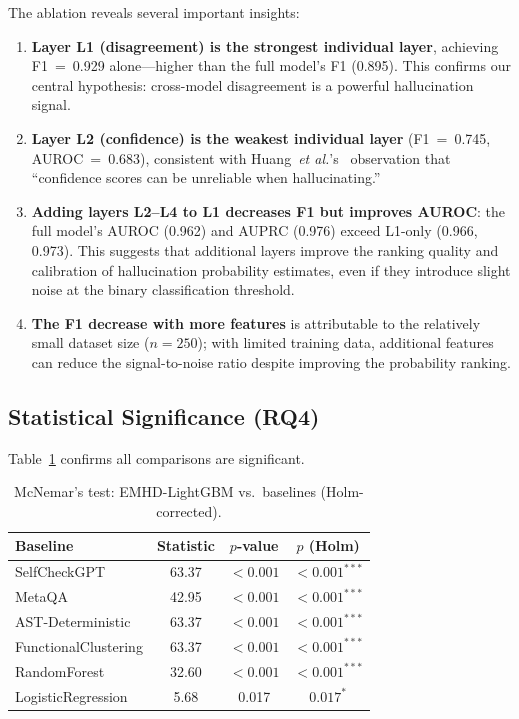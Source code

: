 \documentclass[11pt,a4paper]{article}
\newcommand{\etal}{\textit{et al.}}
\begin{document}
The ablation reveals several important insights:
\begin{enumerate}
\item \textbf{Layer L1 (disagreement) is the strongest individual layer}, achieving F1~=~0.929 alone---higher than the full model's F1 (0.895). This confirms our central hypothesis: cross-model disagreement is a powerful hallucination signal.
\item \textbf{Layer L2 (confidence) is the weakest individual layer} (F1~=~0.745, AUROC~=~0.683), consistent with Huang~\etal's~\cite{huang2025survey} observation that ``confidence scores can be unreliable when hallucinating.''
\item \textbf{Adding layers L2--L4 to L1 decreases F1 but improves AUROC}: the full model's AUROC (0.962) and AUPRC (0.976) exceed L1-only (0.966, 0.973). This suggests that additional layers improve the ranking quality and calibration of hallucination probability estimates, even if they introduce slight noise at the binary classification threshold.
\item \textbf{The F1 decrease with more features} is attributable to the relatively small dataset size ($n=250$); with limited training data, additional features can reduce the signal-to-noise ratio despite improving the probability ranking.
\end{enumerate}

\subsection{Statistical Significance (RQ4)}

Table~\ref{tab:significance} confirms all comparisons are significant.

\begin{table}[t]
\centering
\caption{McNemar's test: EMHD-LightGBM vs.\ baselines (Holm-corrected).}
\label{tab:significance}
\begin{tabular}{lccc}
\toprule
\textbf{Baseline} & \textbf{Statistic} & \textbf{$p$-value} & \textbf{$p$ (Holm)} \\
\midrule
SelfCheckGPT          & 63.37 & $<0.001$ & $<0.001^{***}$ \\
MetaQA                & 42.95 & $<0.001$ & $<0.001^{***}$ \\
AST-Deterministic     & 63.37 & $<0.001$ & $<0.001^{***}$ \\
FunctionalClustering  & 63.37 & $<0.001$ & $<0.001^{***}$ \\
RandomForest          & 32.60 & $<0.001$ & $<0.001^{***}$ \\
LogisticRegression    &  5.68 & 0.017   & $0.017^{*}$  \\
\bottomrule
\end{tabular}
\end{table}
\end{document}
